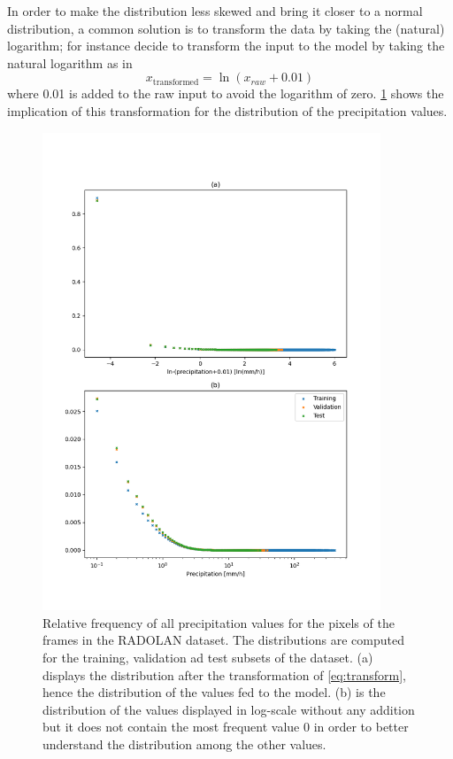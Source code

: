 In order to make the distribution less skewed and bring it closer to a normal distribution, a common solution is to transform the data by taking the (natural) logarithm; for instance \citet{Ayzel2020RainNetNowcasting} decide to transform the input to the model by taking the natural logarithm as in
\begin{equation} \label{eq:transform}
    x_{\text{transformed}} = \ln(x_{raw} + 0.01)
\end{equation}
where 0.01 is added to the raw input to avoid the logarithm of zero. \cref{fig:trainfreq} shows the implication of this transformation for the distribution of the precipitation values.

\begin{figure}[!h]
    \centering
    \includegraphics[width=0.9\textwidth]{figure_datasets.png}
    \caption{Relative frequency of all precipitation values for the pixels of the frames in the RADOLAN dataset. The distributions are computed for the training, validation ad test subsets of the dataset. (a) displays the distribution after the transformation of \cref{eq:transform}, hence the distribution of the values fed to the model. (b) is the distribution of the values displayed in log-scale without any addition but it does not contain the most frequent value 0 in order to better understand the distribution among the other values. }
    \label{fig:trainfreq}
\end{figure}


